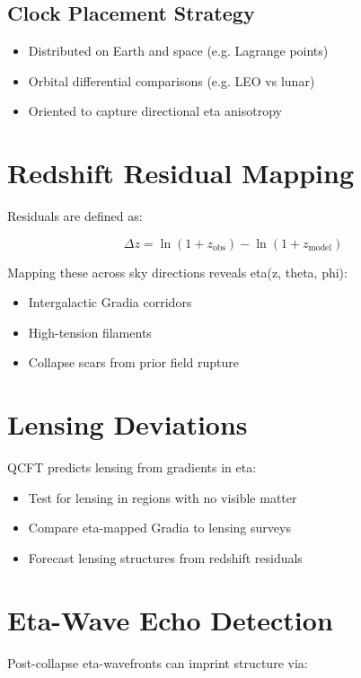 \documentclass[12pt]{article}
\begin{document}
\subsection*{Clock Placement Strategy}

\begin{itemize}
\item Distributed on Earth and space (e.g. Lagrange points)
\item Orbital differential comparisons (e.g. LEO vs lunar)
\item Oriented to capture directional eta anisotropy
\end{itemize}

\section{Redshift Residual Mapping}

Residuals are defined as:

\[
\Delta z = \ln(1 + z_{\text{obs}}) - \ln(1 + z_{\text{model}})
\]

Mapping these across sky directions reveals eta(z, theta, phi):

\begin{itemize}
\item Intergalactic Gradia corridors
\item High-tension filaments
\item Collapse scars from prior field rupture
\end{itemize}

\section{Lensing Deviations}

QCFT predicts lensing from gradients in eta:

\begin{itemize}
\item Test for lensing in regions with no visible matter
\item Compare eta-mapped Gradia to lensing surveys
\item Forecast lensing structures from redshift residuals
\end{itemize}

\section{Eta-Wave Echo Detection}

Post-collapse eta-wavefronts can imprint structure via:
\end{document}
